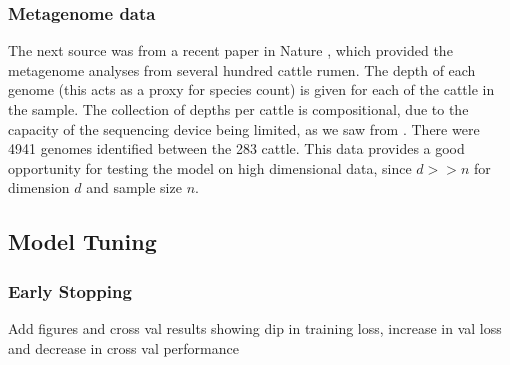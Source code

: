 \subsubsection{Metagenome data}
The next source was from a recent paper in Nature \citep{Stewart2019}, which provided the metagenome analyses from several hundred cattle rumen. The depth of each genome (this acts as a proxy for species count) is given for each of the cattle in the sample. The collection of depths per cattle is compositional, due to the capacity of the sequencing device being limited, as we saw from \cite{Gloor2017}. There were 4941 genomes identified between the 283 cattle. This data provides a good opportunity for testing the model on high dimensional data, since $d >> n$ for dimension $d$ and sample size $n$.  

\subsection{Model Tuning}
\subsubsection{Early Stopping}
Add figures and cross val results showing dip in training loss, increase in val loss and decrease in cross val performance











